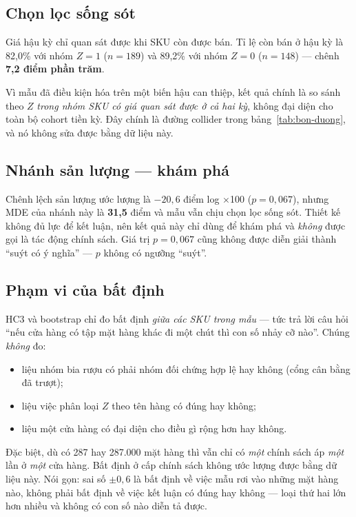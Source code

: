 \documentclass[11pt]{article}
\newcommand{\dvi}{điểm log $\times$100}
\begin{document}
\subsection{Chọn lọc sống sót}
\label{sec:song-sot}

Giá hậu kỳ chỉ quan sát được khi SKU còn được bán. Tỉ lệ còn bán ở hậu kỳ là 82,0\% với nhóm $Z=1$
($n = 189$) và 89,2\% với nhóm $Z=0$ ($n = 148$) --- chênh \textbf{7,2 điểm phần trăm}.

Vì mẫu đã điều kiện hóa trên một biến hậu can thiệp, kết quả chính là so sánh theo $Z$
\emph{trong nhóm SKU có giá quan sát được ở cả hai kỳ}, không đại diện cho toàn bộ cohort tiền kỳ.
Đây chính là đường collider trong bảng~\ref{tab:bon-duong}, và nó không sửa được bằng dữ liệu này.

\subsection{Nhánh sản lượng --- khám phá}

Chênh lệch sản lượng ước lượng là $-20{,}6$ \dvi{} ($p = 0{,}067$), nhưng MDE của nhánh này là
\textbf{31,5} điểm và mẫu vẫn chịu chọn lọc sống sót. Thiết kế không đủ lực để kết luận, nên kết
quả này chỉ dùng để khám phá và \emph{không} được gọi là tác động chính sách. Giá trị $p = 0{,}067$
cũng không được diễn giải thành ``suýt có ý nghĩa'' --- $p$ không có ngưỡng ``suýt''.

\subsection{Phạm vi của bất định}

HC3 và bootstrap chỉ đo bất định \emph{giữa các SKU trong mẫu} --- tức trả lời câu hỏi ``nếu cửa
hàng có tập mặt hàng khác đi một chút thì con số nhảy cỡ nào''. Chúng \emph{không} đo:

\begin{itemize}
  \item liệu nhóm bia rượu có phải nhóm đối chứng hợp lệ hay không (cổng cân bằng đã trượt);
  \item liệu việc phân loại $Z$ theo tên hàng có đúng hay không;
  \item liệu một cửa hàng có đại diện cho điều gì rộng hơn hay không.
\end{itemize}

Đặc biệt, dù có 287 hay 287.000 mặt hàng thì vẫn chỉ có \emph{một} chính sách áp \emph{một} lần ở
\emph{một} cửa hàng. Bất định ở cấp chính sách không ước lượng được bằng dữ liệu này. Nói gọn: sai
số $\pm 0{,}6$ là bất định về việc mẫu rơi vào những mặt hàng nào, không phải bất định về việc kết
luận có đúng hay không --- loại thứ hai lớn hơn nhiều và không có con số nào diễn tả được.
\end{document}
